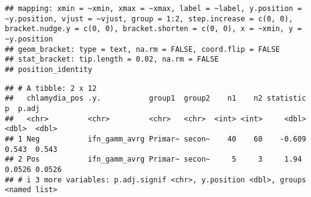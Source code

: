 \documentclass[
]{article}
\newenvironment{Shaded}{\begin{snugshade}}{\end{snugshade}}
\newcommand{\AttributeTok}[1]{\textcolor[rgb]{0.77,0.63,0.00}{#1}}
\newcommand{\FunctionTok}[1]{\textcolor[rgb]{0.00,0.00,0.00}{#1}}
\newcommand{\NormalTok}[1]{#1}
\newcommand{\OtherTok}[1]{\textcolor[rgb]{0.56,0.35,0.01}{#1}}
\newcommand{\SpecialCharTok}[1]{\textcolor[rgb]{0.00,0.00,0.00}{#1}}
\newcommand{\StringTok}[1]{\textcolor[rgb]{0.31,0.60,0.02}{#1}}
\begin{document}
\begin{verbatim}
## mapping: xmin = ~xmin, xmax = ~xmax, label = ~label, y.position = ~y.position, vjust = ~vjust, group = 1:2, step.increase = c(0, 0), bracket.nudge.y = c(0, 0), bracket.shorten = c(0, 0), x = ~xmin, y = ~y.position 
## geom_bracket: type = text, na.rm = FALSE, coord.flip = FALSE
## stat_bracket: tip.length = 0.02, na.rm = FALSE
## position_identity
\end{verbatim}

\begin{Shaded}
\end{Shaded}

\begin{verbatim}
## # A tibble: 2 x 12
##   chlamydia_pos .y.           group1  group2    n1    n2 statistic      p  p.adj
##   <chr>         <chr>         <chr>   <chr>  <int> <int>     <dbl>  <dbl>  <dbl>
## 1 Neg           ifn_gamm_avrg Primar~ secon~    40    60    -0.609 0.543  0.543 
## 2 Pos           ifn_gamm_avrg Primar~ secon~     5     3     1.94  0.0526 0.0526
## # i 3 more variables: p.adj.signif <chr>, y.position <dbl>, groups <named list>
\end{verbatim}
\end{document}
